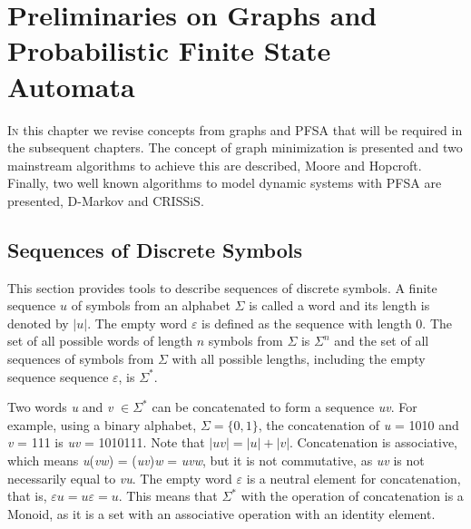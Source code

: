 \chapter{Preliminaries on Graphs and Probabilistic Finite State Automata}\label{cap:2}


{\lettrine[loversize=0.25,findent=0.2em,nindent=0em]{I}{n} this chapter we revise concepts from graphs and PFSA \cite{brianmarcus}\cite{vidal.05} that will be required in the subsequent chapters. The concept of graph minimization is presented and two mainstream algorithms to achieve this are described, Moore and Hopcroft. Finally, two well known algorithms to model dynamic systems with PFSA are presented, D-Markov and CRISSiS.

\section{Sequences of Discrete Symbols}
This section provides tools to describe sequences of discrete symbols. A finite sequence $u$ of symbols from an alphabet $\Sigma$ is called a word and its length is denoted by $|\textit{u}|$. The empty word $\varepsilon$ is defined as the sequence with length 0. The set of all possible words of length $n$ symbols from $\Sigma$ is $\Sigma^n$ and the set of all sequences of symbols from $\Sigma$ with all possible lengths, including the empty sequence sequence $\varepsilon$, is $\Sigma^*$. 

Two words \textit{u} and \textit{v} $\in \Sigma^*$ can be concatenated to form a sequence \textit{uv}. For example, using a binary alphabet, $\Sigma = \{0,1\}$, the concatenation of \textit{u} = 1010 and \textit{v} = 111 is \textit{uv} = 1010111. Note that $|\textit{uv}| = |\textit{u}| + |\textit{v}|$. Concatenation is associative, which means \textit{u}(\textit{vw}) = (\textit{uv})\textit{w} = \textit{uvw}, but it is not commutative, as \textit{uv} is not necessarily equal to \textit{vu}. The empty word $\varepsilon$ is a neutral element for concatenation, that is, $\varepsilon u = u\varepsilon = u$. This means that $\Sigma^*$ with the operation of concatenation is a Monoid, as it is a set with an associative operation with an identity element.

}
